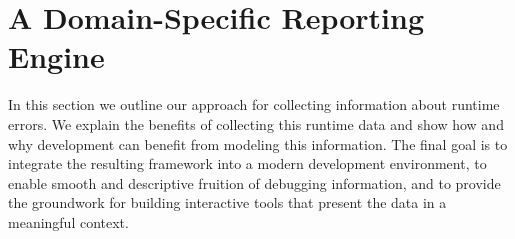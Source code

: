 %
%
%
%


\section{A Domain-Specific Reporting Engine} \label{sec:reified-framework}

In this section we outline our approach for collecting information about runtime errors.
We explain the benefits of collecting this runtime data and show how and why development can benefit from modeling this information.
The final goal is to integrate the resulting framework into a modern development environment, to enable smooth and descriptive fruition of debugging information, and to provide the groundwork for building interactive tools that present the data in a meaningful context.

